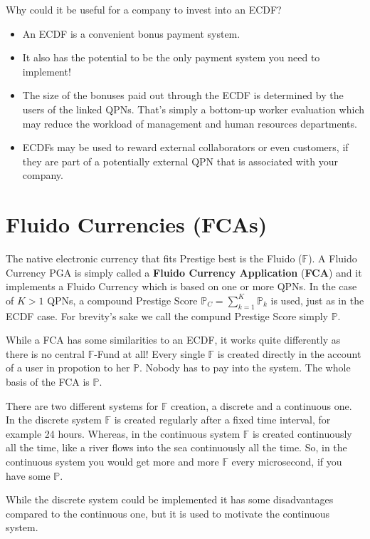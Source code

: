 \documentclass[a4paper,12pt]{scrartcl}
\newcounter{example}
\begin{document}
Why could it be useful for a company to invest into an ECDF?
\begin{itemize}
 \item An ECDF is a convenient bonus payment system.
 \item It also has the potential to be the only payment system you need to implement!
 \item The size of the bonuses paid out through the ECDF is determined by the users of the linked QPNs. That's simply a bottom-up worker evaluation which may reduce the workload of management and human resources departments.
 \item ECDFs may be used to reward external collaborators or even customers, if they are part of a potentially external QPN that is associated with your company.
\end{itemize}


\section{Fluido Currencies (FCAs)}
The native electronic currency that fits Prestige best is the Fluido ($\mathbb{F}$). A Fluido Currency PGA is simply called a \textbf{Fluido Currency Application} (\textbf{FCA}) and it implements a Fluido Currency which is based on one or more QPNs. In the case of $K>1$ QPNs, a compound Prestige Score $\mathbb{P}_C = \sum_{k=1}^K \mathbb{P}_k$ is used, just as in the ECDF case. For brevity's sake we call the compund Prestige Score simply $\mathbb{P}$.

While a FCA has some similarities to an ECDF, it works quite differently as there is no central $\mathbb{F}$-Fund at all! Every single $\mathbb{F}$ is created directly in the account of a user in propotion to her $\mathbb{P}$. Nobody has to pay into the system. The whole basis of the FCA is $\mathbb{P}$.

There are two different systems for $\mathbb{F}$ creation, a discrete and a continuous one. In the discrete system $\mathbb{F}$ is created regularly after a fixed time interval, for example 24 hours. Whereas, in the continuous system $\mathbb{F}$ is created continuously all the time, like a river flows into the sea continuously all the time. So, in the continuous system you would get more and more $\mathbb{F}$ every microsecond, if you have some $\mathbb{P}$.

While the discrete system could be implemented it has some disadvantages compared to the continuous one, but it is used to motivate the continuous system.
\end{document}
